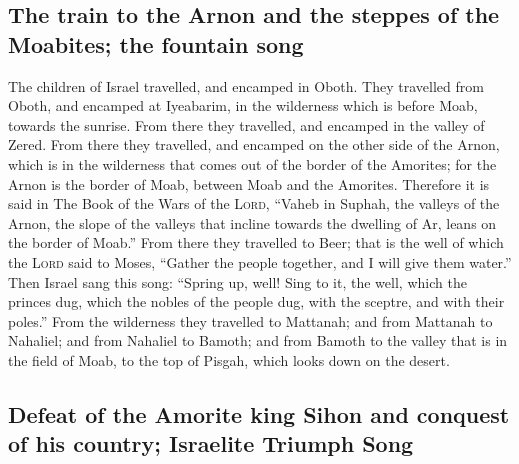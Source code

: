 \hypertarget{the-train-to-the-arnon-and-the-steppes-of-the-moabites-the-fountain-song}{%
\subsection{The train to the Arnon and the steppes of the Moabites; the
fountain
song}\label{the-train-to-the-arnon-and-the-steppes-of-the-moabites-the-fountain-song}}

 The children of Israel travelled, and encamped in Oboth.
 They travelled from Oboth, and encamped at Iyeabarim, in
the wilderness which is before Moab, towards the sunrise.
 From there they travelled, and encamped in the valley of
Zered.  From there they travelled, and encamped on the
other side of the Arnon, which is in the wilderness that comes out of
the border of the Amorites; for the Arnon is the border of Moab, between
Moab and the Amorites.  Therefore it is said in The Book
of the Wars of the \textsc{Lord}, ``Vaheb in Suphah, the valleys of the
Arnon,  the slope of the valleys that incline towards the
dwelling of Ar, leans on the border of Moab.''  From
there they travelled to Beer; that is the well of which the
\textsc{Lord} said to Moses, ``Gather the people together, and I will
give them water.''  Then Israel sang this song: ``Spring
up, well! Sing to it,  the well, which the princes dug,
which the nobles of the people dug, with the sceptre, and with their
poles.'' From the wilderness they travelled to Mattanah; 
and from Mattanah to Nahaliel; and from Nahaliel to Bamoth;
 and from Bamoth to the valley that is in the field of
Moab, to the top of Pisgah, which looks down on the desert.

\hypertarget{defeat-of-the-amorite-king-sihon-and-conquest-of-his-country-israelite-triumph-song}{%
\subsection{Defeat of the Amorite king Sihon and conquest of his
country; Israelite Triumph
Song}\label{defeat-of-the-amorite-king-sihon-and-conquest-of-his-country-israelite-triumph-song}}


